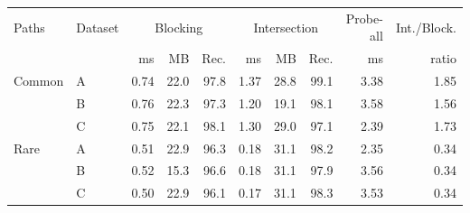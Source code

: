 \begin{tabular}{llrrrrrrrr}
\toprule
Paths & Dataset & \multicolumn{3}{c}{Blocking} & \multicolumn{3}{c}{Intersection} & Probe-all & Int./Block.\\
\cmidrule(lr){3-5}\cmidrule(lr){6-8}
 &  & ms & MB & Rec. & ms & MB & Rec. & ms & ratio\\
\midrule
Common & A & 0.74 & 22.0 & 97.8 & 1.37 & 28.8 & 99.1 & 3.38 & 1.85\\
 & B & 0.76 & 22.3 & 97.3 & 1.20 & 19.1 & 98.1 & 3.58 & 1.56\\
 & C & 0.75 & 22.1 & 98.1 & 1.30 & 29.0 & 97.1 & 2.39 & 1.73\\\addlinespace[2pt]
Rare & A & 0.51 & 22.9 & 96.3 & 0.18 & 31.1 & 98.2 & 2.35 & 0.34\\
 & B & 0.52 & 15.3 & 96.6 & 0.18 & 31.1 & 97.9 & 3.56 & 0.34\\
 & C & 0.50 & 22.9 & 96.1 & 0.17 & 31.1 & 98.3 & 3.53 & 0.34\\
\bottomrule
\end{tabular}
